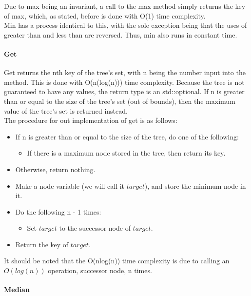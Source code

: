 \documentclass{article}
\begin{document}
\noindent
Due to max being an invariant, a call to the max method simply returns the key of max, which, as stated, before is done with O(1) time complexity.
\\

\noindent
Min has a process identical to this, with the sole exception being that the uses of greater than and less than are reversed. Thus, min also runs in constant time.
\\

\paragraph{Get}

\noindent
Get returns the nth key of the tree’s set, with n being the number input into the method. This is done with O(n(log(n))) time complexity. Because the tree is not guaranteed to have any values, the return type is an std::optional. If n is greater than or equal to the size of the tree’s set (out of bounds), then the maximum value of the tree’s set is returned instead.
\\

\noindent
The procedure for out implementation of get is as follows:

\begin{itemize}
    \item If n is greater than or equal to the size of the tree, do one of the following:
        \begin{itemize} \item If there is a maximum node stored in the tree, then return its key. \end{itemize}
    \item Otherwise, return nothing.
    \item Make a node variable (we will call it $target$), and store the minimum node in it.
    \item Do the following n - 1 times:
        \begin{itemize}\item Set $target$ to the successor node of $target$. \end{itemize}
    \item Return the key of $target$.
\end{itemize}

\noindent
It should be noted that the O(nlog(n)) time complexity is due to calling an $O(log(n))$ operation, successor node, n times.
\\

\paragraph{Median}
\end{document}
